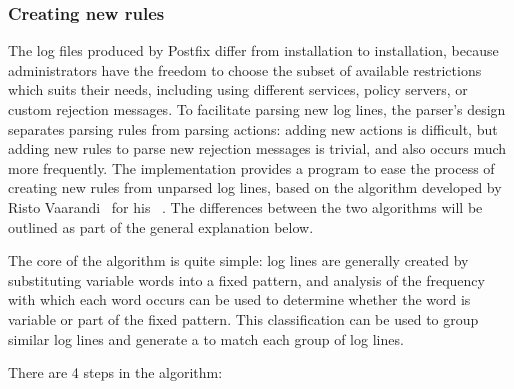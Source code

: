 \subsubsection{Creating new rules}

\label{creating new rules}

The log files produced by Postfix differ from installation to installation,
because administrators have the freedom to choose the subset of available
restrictions which suits their needs, including using different \DNSBL{}
services, policy servers, or custom rejection messages.  To facilitate
parsing new log lines, the parser's design separates parsing rules from
parsing actions: adding new actions is difficult, but adding new rules to
parse new rejection messages is trivial, and also occurs much more
frequently.  The implementation provides a program to ease the process of
creating new rules from unparsed log lines, based on the algorithm
developed by Risto Vaarandi~\cite{risto-vaarandi} for his
\SLCT{}~\cite{slct-paper}.  The differences between the two algorithms will
be outlined as part of the general explanation below.

The core of the algorithm is quite simple: log lines are generally created
by substituting variable words into a fixed pattern, and analysis of the
frequency with which each word occurs can be used to determine whether the
word is variable or part of the fixed pattern.  This classification can be
used to group similar log lines and generate a \regex{} to match each group
of log lines.

There are 4 steps in the algorithm:

